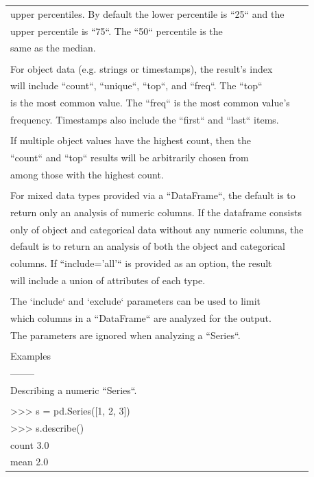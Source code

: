 \documentclass[11pt]{article}
\begin{document}
\begin{enumerate}
\begin{enumerate}
\begin{enumerate}
\begin{center}
\begin{tabular}{l}
upper percentiles. By default the lower percentile is ``25`` and the\\
upper percentile is ``75``. The ``50`` percentile is the\\
same as the median.\\
\\
For object data (e.g. strings or timestamps), the result's index\\
will include ``count``, ``unique``, ``top``, and ``freq``. The ``top``\\
is the most common value. The ``freq`` is the most common value's\\
frequency. Timestamps also include the ``first`` and ``last`` items.\\
\\
If multiple object values have the highest count, then the\\
``count`` and ``top`` results will be arbitrarily chosen from\\
among those with the highest count.\\
\\
For mixed data types provided via a ``DataFrame``, the default is to\\
return only an analysis of numeric columns. If the dataframe consists\\
only of object and categorical data without any numeric columns, the\\
default is to return an analysis of both the object and categorical\\
columns. If ``include='all'`` is provided as an option, the result\\
will include a union of attributes of each type.\\
\\
The `include` and `exclude` parameters can be used to limit\\
which columns in a ``DataFrame`` are analyzed for the output.\\
The parameters are ignored when analyzing a ``Series``.\\
\\
Examples\\
--------\\
Describing a numeric ``Series``.\\
\\
>>> s = pd.Series([1, 2, 3])\\
>>> s.describe()\\
count    3.0\\
mean     2.0\\

\end{tabular}
\end{center}
\end{enumerate}
\end{enumerate}
\end{enumerate}
\end{document}
